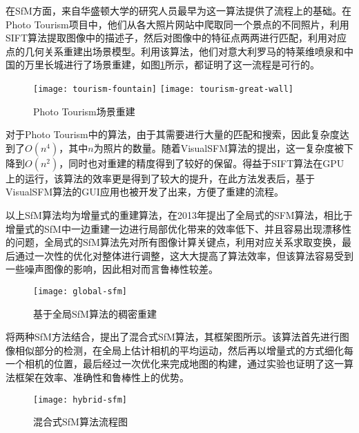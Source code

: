 在SfM方面，来自华盛顿大学的研究人员\citet{snavely2006photo}最早为这一算法提供了流程上的基础。在Photo Tourism项目中，他们从各大照片网站中爬取同一个景点的不同照片，利用SIFT算法\cite{lowe2004distinctive}提取图像中的描述子，然后对图像中的特征点两两进行匹配，利用对应点的几何关系重建出场景模型。利用该算法，他们对意大利罗马的特莱维喷泉和中国的万里长城进行了场景重建，如图\ref{photo-tourism}所示，都证明了这一流程是可行的。
\begin{figure}
	\centering
	{\texttt{[image: tourism-fountain]}}
	{\texttt{[image: tourism-great-wall]}}
	\caption{Photo Tourism场景重建}
	\label{photo-tourism}
\end{figure}

对于Photo Tourism中的算法，由于其需要进行大量的匹配和搜索，因此复杂度达到了$O(n^4)$，其中$n$为照片的数量。随着VisualSFM算法\cite{wu2011visualsfm}的提出，这一复杂度被下降到$O(n^2)$，同时也对重建的精度得到了较好的保留。得益于SIFT算法在GPU上的运行\cite{acharya2013speeding}，该算法的效率更是得到了较大的提升，在此方法发表后，基于VisualSFM算法的GUI应用也被开发了出来，方便了重建的流程。

以上SfM算法均为增量式的重建算法，\citet{moulon2013global}在2013年提出了全局式的SFM算法，相比于增量式的SfM中一边重建一边进行局部优化带来的效率低下、并且容易出现漂移性的问题，全局式的SfM算法先对所有图像计算关键点，利用对应关系求取变换，最后通过一次性的优化对整体进行调整，这大大提高了算法效率，但该算法容易受到一些噪声图像的影响，因此相对而言鲁棒性较差。
\begin{figure}
	\centering
	\texttt{[image: global-sfm]}
	\caption{基于全局SfM算法的稠密重建}
	\label{global-sfm}
\end{figure}

\citet{cui2017hsfm}将两种SfM方法结合，提出了混合式SfM算法，其框架图所示。该算法首先进行图像相似部分的检测，在全局上估计相机的平均运动，然后再以增量式的方式细化每一个相机的位置，最后经过一次优化来完成地图的构建，通过实验也证明了这一算法框架在效率、准确性和鲁棒性上的优势。
\begin{figure}
	\centering
	\texttt{[image: hybrid-sfm]}
	\caption{混合式SfM算法流程图}
	\label{hybrid-sfm}
\end{figure}

